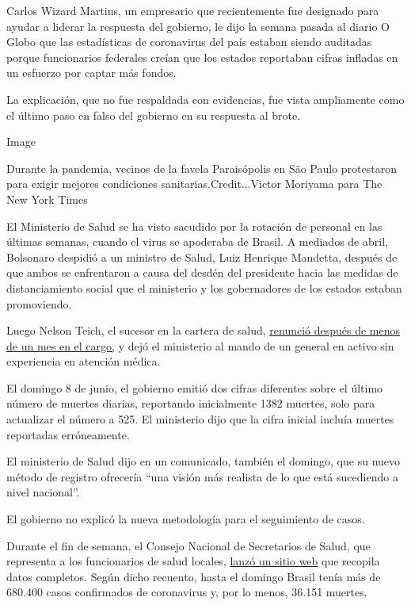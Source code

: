 Carlos Wizard Martins, un empresario que recientemente fue designado
para ayudar a liderar la respuesta del gobierno, le dijo la semana
pasada al diario O Globo que las estadísticas de coronavirus del país
estaban siendo auditadas porque funcionarios federales creían que los
estados reportaban cifras infladas en un esfuerzo por captar más fondos.

La explicación, que no fue respaldada con evidencias, fue vista
ampliamente como el último paso en falso del gobierno en su respuesta al
brote.

Image

Durante la pandemia, vecinos de la favela Paraisópolis en São Paulo
protestaron para exigir mejores condiciones sanitarias.Credit...Victor
Moriyama para The New York Times

El Ministerio de Salud se ha visto sacudido por la rotación de personal
en las últimas semanas, cuando el virus se apoderaba de Brasil. A
mediados de abril, Bolsonaro despidió a un ministro de Salud, Luiz
Henrique Mandetta, después de que ambos se enfrentaron a causa del
desdén del presidente hacia las medidas de distanciamiento social que el
ministerio y los gobernadores de los estados estaban promoviendo.

Luego Nelson Teich, el sucesor en la cartera de salud,
\href{https://www.nytimes3xbfgragh.onion/2020/05/15/world/americas/brazil-health-minister-bolsonaro.html}{renunció
después de menos de un mes en el cargo,} y dejó el ministerio al mando
de un general en activo sin experiencia en atención médica.

El domingo 8 de junio, el gobierno emitió dos cifras diferentes sobre el
último número de muertes diarias, reportando inicialmente 1382 muertes,
solo para actualizar el número a 525. El ministerio dijo que la cifra
inicial incluía muertes reportadas erróneamente.

El ministerio de Salud dijo en un comunicado, también el domingo, que su
nuevo método de registro ofrecería ``una visión más realista de lo que
está sucediendo a nivel nacional''.

El gobierno no explicó la nueva metodología para el seguimiento de
casos.

Durante el fin de semana, el Consejo Nacional de Secretarios de Salud,
que representa a los funcionarios de salud locales,
\href{http://www.conass.org.br/painelconasscovid19/}{lanzó un sitio web}
que recopila datos completos. Según dicho recuento, hasta el domingo
Brasil tenía más de 680.400 casos confirmados de coronavirus y, por lo
menos, 36.151 muertes.

